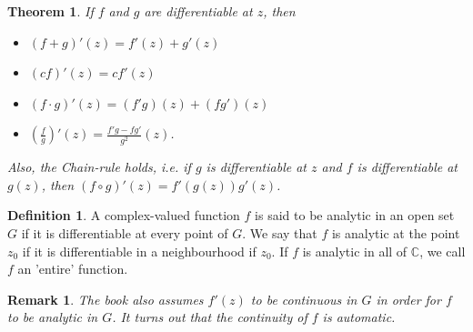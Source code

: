 \documentclass[12pt, a4paper]{article}
\theoremstyle{plain}
\newtheorem{thm}{Theorem} %
\newtheorem{rem}{Remark}
\theoremstyle{definition}
\newtheorem{definition}{Definition} %
\begin{document}
			\begin{thm}
				If $f$ and $g$ are differentiable at $z$, then
				\begin{itemize}
					\item $(f+g)'(z) = f'(z)+g'(z)$
					\item $(cf)'(z) = cf'(z)$
					\item $(f\cdot g)'(z) = (f'g)(z)+(fg')(z)$
					\item $\left(\frac{f}{g}\right)'(z) = \frac{f'g-fg'}{g^2}(z)$.
				\end{itemize}
				Also, the Chain-rule holds, i.e. if $g$ is differentiable at $z$ and $f$ is differentiable at $g(z)$, then $(f\circ g)'(z) = f'(g(z))g'(z)$.\\
			\end{thm}
			\begin{definition}
				A complex-valued function $f$ is said to be analytic in an open set $G$ if it is differentiable at every point of $G$. We say that $f$ is analytic at the point $z_0$ if it is differentiable in a neighbourhood if $z_0$. If $f$ is analytic in all of $\mathbb{C}$, we call $f$ an 'entire' function.\\
			\end{definition}
			\begin{rem}
				The book also assumes $f'(z)$ to be continuous in $G$ in order for $f$ to be analytic in $G$. It turns out that the continuity of $f$ is automatic.
			\end{rem}
\end{document}
